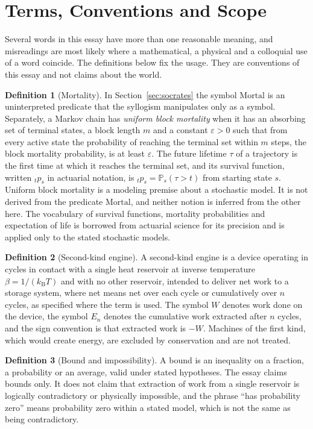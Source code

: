 \documentclass[11pt]{article}
\theoremstyle{definition}
\newtheorem{definition}{Definition}
\theoremstyle{remark}
\renewcommand{\Pr}{\mathbb{P}}
\newcommand{\kB}{k_{\mathrm B}}
\begin{document}
\section{Terms, Conventions and Scope}\label{sec:terms}

Several words in this essay have more than one reasonable meaning, and misreadings are most likely where a mathematical, a physical and a colloquial use of a word coincide. The definitions below fix the usage. They are conventions of this essay and not claims about the world.

\begin{definition}[Mortality]
In Section~\ref{sec:socrates} the symbol $\mathrm{Mortal}$ is an uninterpreted predicate that the syllogism manipulates only as a symbol. Separately, a Markov chain has \emph{uniform block mortality} when it has an absorbing set of terminal states, a block length $m$ and a constant $\varepsilon > 0$ such that from every active state the probability of reaching the terminal set within $m$ steps, the block mortality probability, is at least $\varepsilon$. The future lifetime $\tau$ of a trajectory is the first time at which it reaches the terminal set, and its survival function, written ${}_{t}p_{s}$ in actuarial notation, is ${}_{t}p_{s} = \Pr_s(\tau > t)$ from starting state $s$. Uniform block mortality is a modeling premise about a stochastic model. It is not derived from the predicate $\mathrm{Mortal}$, and neither notion is inferred from the other here. The vocabulary of survival functions, mortality probabilities and expectation of life is borrowed from actuarial science for its precision and is applied only to the stated stochastic models.
\end{definition}

\begin{definition}[Second-kind engine]
A second-kind engine is a device operating in cycles in contact with a single heat reservoir at inverse temperature $\beta = 1/(\kB T)$ and with no other reservoir, intended to deliver net work to a storage system, where net means net over each cycle or cumulatively over $n$ cycles, as specified where the term is used. The symbol $W$ denotes work done on the device, the symbol $E_n$ denotes the cumulative work extracted after $n$ cycles, and the sign convention is that extracted work is $-W$. Machines of the first kind, which would create energy, are excluded by conservation and are not treated.
\end{definition}

\begin{definition}[Bound and impossibility]
A bound is an inequality on a fraction, a probability or an average, valid under stated hypotheses. The essay claims bounds only. It does not claim that extraction of work from a single reservoir is logically contradictory or physically impossible, and the phrase ``has probability zero'' means probability zero within a stated model, which is not the same as being contradictory.
\end{definition}
\end{document}
